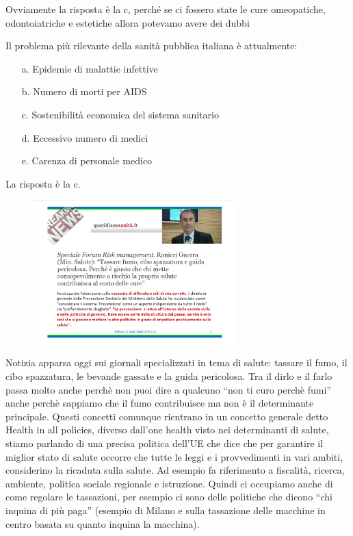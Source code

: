 Ovviamente la risposta è la c, perché se ci fossero state le cure
omeopatiche, odontoiatriche e estetiche allora potevamo avere dei dubbi

Il problema più rilevante della sanità pubblica italiana è attualmente:

\begin{itemize}
\item[a.]
  Epidemie di malattie infettive
\item[b.]
  Numero di morti per AIDS
\item[c.]
  Sostenibilità economica del sistema sanitario
\item[d.]
  Eccessivo numero di medici
\item[e.]
  Carenza di personale medico
\end{itemize}

La risposta è la c.

\begin{figure}[!ht]
\centering
	\includegraphics[width=0.7\textwidth]{21/image1.png}
	\end{figure}

Notizia apparsa oggi sui giornali specializzati in tema di salute:
tassare il fumo, il cibo spazzatura, le bevande gassate e la guida
pericolosa. Tra il dirlo e il farlo passa molto anche perchè non puoi
dire a qualcuno ``non ti curo perchè fumi'' anche perchè sappiamo che il
fumo contribuisce ma non è il determinante principale. Questi concetti
comunque rientrano in un concetto generale detto Health in all policies,
diverso dall'one health visto nei determinanti di salute, stiamo
parlando di una precisa politica dell'UE che dice che per garantire il
miglior stato di salute occorre che tutte le leggi e i provvedimenti in
vari ambiti, considerino la ricaduta sulla salute. Ad esempio fa
riferimento a fiscalità, ricerca, ambiente, politica sociale regionale e
istruzione. Quindi ci occupiamo anche di come regolare le tassazioni,
per esempio ci sono delle politiche che dicono ``chi inquina di più
paga'' (esempio di Milano e sulla tassazione delle macchine in centro
basata su quanto inquina la macchina).

